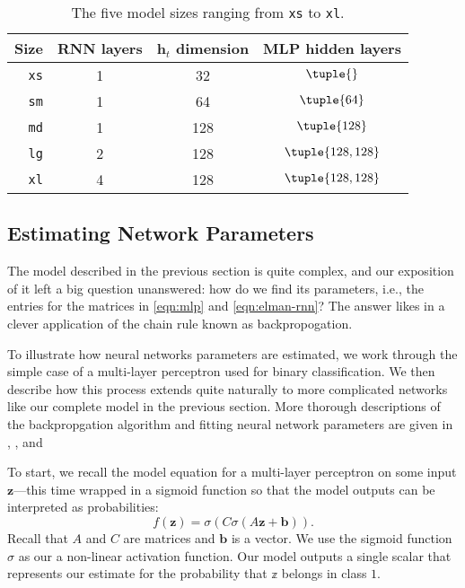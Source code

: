 \begin{table}
	\begin{tabular}{r ccc}
		\hline
		Size        & RNN layers & $\mathbf h_t$ dimension & MLP hidden layers  \\
		\hline
		\texttt{xs} & 1          & 32                      & $\tuple{}$         \\
		\texttt{sm} & 1          & 64                      & $\tuple{64}$       \\
		\texttt{md} & 1          & 128                     & $\tuple{128}$      \\
		\texttt{lg} & 2          & 128                     & $\tuple{128, 128}$ \\
		\texttt{xl} & 4          & 128                     & $\tuple{128, 128}$ \\
		\hline
	\end{tabular}
	\caption{The five model sizes ranging from \texttt{xs} to \texttt{xl}.}
	\label{tbl:model-sizes}
\end{table}

\subsection{Estimating Network Parameters}


The model described in the previous section is quite complex, and our exposition of it left a big question unanswered: how do we find its parameters, i.e., the entries for the matrices in \autoref{eqn:mlp} and \autoref{eqn:elman-rnn}? The answer likes in a clever application of the chain rule known as backpropogation.

To illustrate how neural networks parameters are estimated, we work through the simple case of a multi-layer perceptron used for binary classification. We then describe how this process extends quite naturally to more complicated networks like our complete model in the previous section. More thorough descriptions of the backpropgation algorithm and fitting neural network parameters are given in \textcite[\S 13.4]{PML}, \textcite[\S 11.4]{ESL}, and \textcite[10.7]{ISL}

To start, we recall the model equation for a multi-layer perceptron on some input $\mathbf z$---this time wrapped in a sigmoid function so that the model outputs can be interpreted as probabilities:
\begin{equation}
	f(\mathbf z) = \sigma (C \sigma (A\mathbf z + \mathbf b)).
\end{equation}
Recall that $A$ and $C$ are matrices and $\mathbf b$ is a vector. We use the sigmoid function $\sigma$ as our a non-linear activation function. Our model outputs a single scalar that represents our estimate for the probability that $\mathbb z$ belongs in class $1$.

